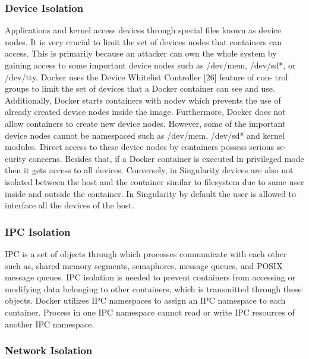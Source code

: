 \documentclass[a4paper,num-refs]{oup-contemporary}
\begin{document}
\subsubsection{Device Isolation}

Applications and kernel access devices through special files known as device
nodes. It is very crucial to limit the set of devices nodes that containers can
access. This is primarily because an attacker can own the whole system by
gaining access to some important device nodes such as /dev/mem, /dev/sd*,
or /dev/tty. Docker uses the Device Whitelist Controller [26] feature of con-
trol groups to limit the set of devices that a Docker container can see and use.
Additionally, Docker starts containers with nodev which prevents the use of
already created device nodes inside the image. Furthermore, Docker does not
allow containers to create new device nodes. However, some of the important
device nodes cannot be namespaced such as /dev/mem, /dev/sd* and kernel
modules. Direct access to these device nodes by containers possess serious se-
curity concerns. Besides that, if a Docker container is executed in privileged
mode then it gets access to all devices. Conversely, in Singularity devices are
also not isolated between the host and the container similar to filesystem due to
same user inside and outside the container. In Singularity by default the user
is allowed to interface all the devices of the host.
\subsubsection{IPC Isolation}

IPC is a set of objects through which processes communicate with each other
such as, shared memory segments, semaphores, message queues, and POSIX
message queues. IPC isolation is needed to prevent containers from accessing
or modifying data belonging to other containers, which is transmitted through
these objects. Docker utilizes IPC namespaces to assign an IPC namespace
to each container. Process in one IPC namespace cannot read or write IPC
resources of another IPC namespace.

\subsubsection{Network Isolation}
\end{document}
